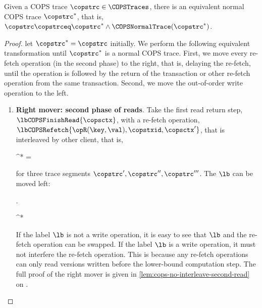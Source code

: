 \begin{theorem}
Given a COPS trace \( \copstrc \in \COPSTraces \),
there is an equivalent normal COPS trace \( \copstrc^* \),
that is, \( \copstrc \copstrceq \copstrc^* \land \COPSNormalTrace(\copstrc^*) \).
\end{theorem}
\begin{proof}
let \( \copstrc^* = \copstrc \) initially.
We perform the following equivalent transformation until \( \copstrc^* \) is a normal COPS trace.
First, we move every re-fetch operation (in the second phase) to the right, that is, delaying the re-fetch,
until the operation is followed by the return of the transaction or other re-fetch operation from the same transaction.
Second, we move the out-of-order write operation to the left.
\begin{enumerate}
\item{\textbf{Right mover: second phase of reads}.} \label{item:cops-second-read}
    Take the first read return step, \( \lbCOPSFinishRead{\copsctx} \),
    with a re-fetch operation, \(\lbCOPSRefetch{\opR(\key,\val), \copstxid, \copsctx' }\),  that 
    is interleaved by other client, that is,
    \begin{Formulae}
    \begin{Formula}
        \copstrc^* = 
        \land \lb \neq {}
    \end{Formula}
    \end{Formulae}
    for three trace segments \( \copstrc', \copstrc'', \copstrc''' \).
    The \( \lb \) can be moved left:
    \begin{Formulae}
    \begin{Formula}
        \begin{Bracketed}  .
        \end{Bracketed} \copstrceq \copstrc^*
    \end{Formula}
    \end{Formulae}
    If the label \( \lb \) is not a write operation, 
    it is easy to see that \( \lb \) and the re-fetch operation can be swapped.
    If the label \( \lb \) is a write operation, it must not interfere the re-fetch operation.
    This is because any re-fetch operations can only read versions written before the lower-bound computation step.
    The full proof of the right mover is given in \cref{lem:cops-no-interleave-second-read}
    on \pageref{lem:cops-no-interleave-second-read}.


\end{enumerate}
\end{proof}
